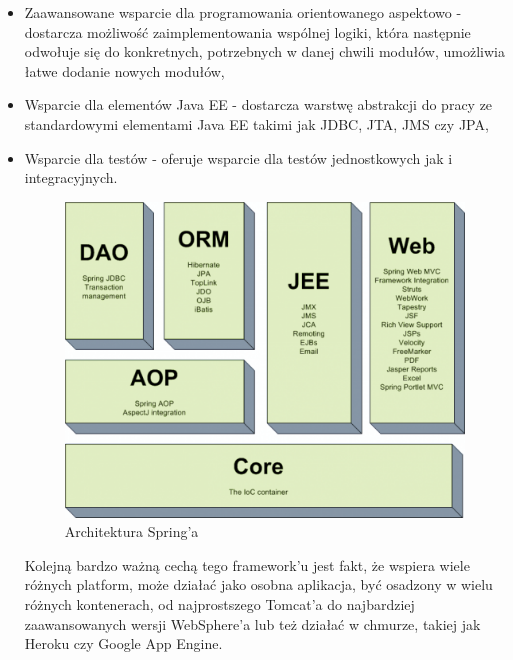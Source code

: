 \begin{itemize}
	\item Zaawansowane wsparcie dla programowania orientowanego aspektowo - dostarcza możliwość zaimplementowania wspólnej logiki, która następnie odwołuje się do konkretnych, potrzebnych w danej chwili modułów, umożliwia łatwe dodanie nowych modułów,
	\item Wsparcie dla elementów Java EE - dostarcza warstwę abstrakcji do pracy ze standardowymi elementami Java EE takimi jak JDBC, JTA, JMS czy JPA,
	\item Wsparcie dla testów - oferuje wsparcie dla testów jednostkowych jak i integracyjnych.
\begin{figure}[!h]
	\centering
	\includegraphics[scale=0.45]{springArchitektura.png} 
	\caption{Architektura Spring'a}
\end{figure}
Kolejną bardzo ważną cechą tego framework'u jest fakt, że wspiera wiele różnych platform, może działać jako osobna aplikacja, być osadzony w wielu różnych kontenerach, od najprostszego Tomcat'a do najbardziej zaawansowanych wersji WebSphere'a lub też działać w chmurze, takiej jak Heroku czy Google App Engine.  
\end{itemize}



